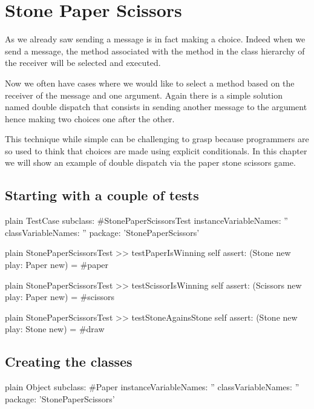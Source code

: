 \documentclass[10pt,twoside,english]{_support/latex/sbabook/sbabook}
\begin{document}
\frontmatter
\pagestyle{plain}

\tableofcontents*
\clearpage\listoffigures

\mainmatter

\chapter{Stone Paper Scissors}\label{cha_stone}
As we already saw sending a message is in fact making a choice. Indeed when we send a message, the method associated with the method in the class hierarchy of the receiver will be selected and executed. 

Now we often have cases where we would like to select a method based on the receiver of the message and one argument. 
Again there is a simple solution named double dispatch that consists in sending another message to the argument hence making two choices one after the other. 

This technique while simple can be challenging to grasp because programmers are so used to think that choices are made using explicit conditionals.  In this chapter we will show an example of double dispatch via the paper stone scissors game. 
\section{Starting with a couple of tests}
\begin{displaycode}{plain}
TestCase subclass: #StonePaperScissorsTest
	instanceVariableNames: ''
	classVariableNames: ''
	package: 'StonePaperScissors'
\end{displaycode}

\begin{displaycode}{plain}
StonePaperScissorsTest >> testPaperIsWinning
	self assert: (Stone new play: Paper new) = #paper
\end{displaycode}

\begin{displaycode}{plain}
StonePaperScissorsTest >> testScissorIsWinning
	self assert: (Scissors new play: Paper new) = #scissors
\end{displaycode}

\begin{displaycode}{plain}
StonePaperScissorsTest >> testStoneAgainsStone
	self assert: (Stone new play: Stone new) = #draw
\end{displaycode}
\section{Creating the classes}
\begin{displaycode}{plain}
Object subclass: #Paper
	instanceVariableNames: ''
	classVariableNames: ''
	package: 'StonePaperScissors'
\end{displaycode}
\end{document}
